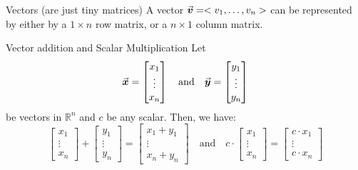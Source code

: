 \documentclass{beamer}
\begin{document}
\begin{frame}
\begin{block}{Vectors (are just tiny matrices)}
A vector ${\vec{\boldsymbol{v}}}=< v_1,\dots,v_n >$ can be represented by either by a $1\times n$ row matrix, or a $n\times 1$ column matrix.
\end{block}\pause
\begin{block}{Vector addition and Scalar Multiplication}
Let
\[
{\vec{\boldsymbol{x}}}=\begin{bmatrix}x_1\\\vdots\\x_n\end{bmatrix}
\quad\text{and}\quad
{\vec{\boldsymbol{y}}}=\begin{bmatrix}y_1\\\vdots\\y_n\end{bmatrix}
\]
be vectors in  $\mathbb{R}^n$ and $c$ be any scalar. Then, we have:
\[
\begin{bmatrix}x_1\\\vdots\\x_n\end{bmatrix}+
\begin{bmatrix}y_1\\\vdots\\y_n\end{bmatrix}=
\begin{bmatrix}x_1+y_1\\\vdots\\x_n+y_n\end{bmatrix}
\quad\text{and}\quad
c\cdot\begin{bmatrix}x_1\\\vdots\\x_n\end{bmatrix}=
\begin{bmatrix} c\cdot x_1\\\vdots\\ c\cdot x_n\end{bmatrix}
\]
\end{block}
\end{frame}
\end{document}
